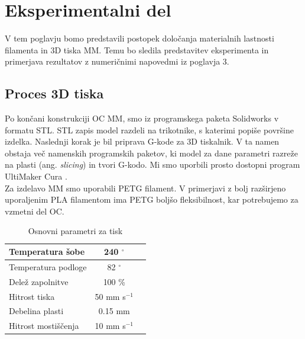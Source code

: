\documentclass[12pt]{report}
\begin{document}
\chapter{Eksperimentalni del}
V tem poglavju bomo predstavili postopek določanja materialnih lastnosti filamenta in 3D tiska \ac{MM}. Temu bo sledila predstavitev eksperimenta in primerjava rezultatov z numeričnimi 
napovedmi iz poglavja 3.

\section{Proces 3D tiska}
Po končani konstrukciji \ac{OC} \ac{MM}, smo iz programskega paketa Solidworks \cite{solidworks} v formatu STL. STL zapis model razdeli na trikotnike, s katerimi popiše površine izdelka. Naslednji korak je bil priprava G-kode za 3D tiskalnik. V ta namen obstaja več namenskih programskih paketov, ki model za dane parametri razreže na plasti (ang. \emph{slicing}) in tvori
G-kodo. Mi smo uporbili prosto dostopni program UltiMaker Cura \cite{cura}. \\
Za izdelavo \ac{MM} smo uporabili PETG filament. V primerjavi z bolj razširjeno uporaljenim PLA filamentom ima PETG boljšo fleksibilnost, kar potrebujemo za vzmetni del \ac{OC}.

\begin{table}[H]
  \caption{Osnovni parametri za tisk}
  \begin{center}
  \begin{tabular}{ | l | c | r | }
    \hline
    Temperatura šobe & 240 $^{\circ}$ \\ \hline
    Temperatura podloge & 82 $^{\circ}$ \\ \hline
    Delež zapolnitve & 100 \% \\ \hline
    Hitrost tiska & 50 mm s$^{-1}$ \\ \hline
    Debelina plasti & 0.15 mm \\ \hline
    Hitrost mostiščenja & 10 mm s$^{-1}$ \\
    \hline  
  \end{tabular}
  \end{center}
\end{table}
\end{document}
